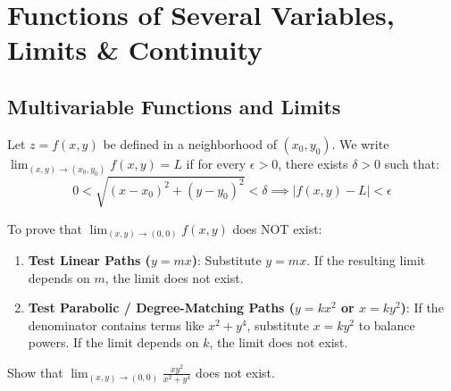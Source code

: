 \section{Functions of Several Variables, Limits \& Continuity}

\subsection{Multivariable Functions and Limits}

\begin{definition}
Let $z = f(x,y)$ be defined in a neighborhood of $(x_0, y_0)$. We write $\lim_{(x,y)\to(x_0,y_0)} f(x,y) = L$ if for every $\epsilon > 0$, there exists $\delta > 0$ such that:
\begin{equation}
    0 < \sqrt{(x-x_0)^2 + (y-y_0)^2} < \delta \implies |f(x,y) - L| < \epsilon
\end{equation}
\end{definition}

\begin{methodbox}
To prove that $\lim_{(x,y)\to(0,0)} f(x,y)$ does NOT exist:
\begin{enumerate}[leftmargin=1.5em]
    \item \textbf{Test Linear Paths ($y = mx$)}: Substitute $y = mx$. If the resulting limit depends on $m$, the limit does not exist.
    \item \textbf{Test Parabolic / Degree-Matching Paths ($y = kx^2$ or $x = ky^2$)}: If the denominator contains terms like $x^2 + y^4$, substitute $x = ky^2$ to balance powers. If the limit depends on $k$, the limit does not exist.
\end{enumerate}
\end{methodbox}

\begin{example}
Show that $\lim_{(x,y)\to(0,0)} \frac{x y^2}{x^2 + y^4}$ does not exist.
\end{example}

